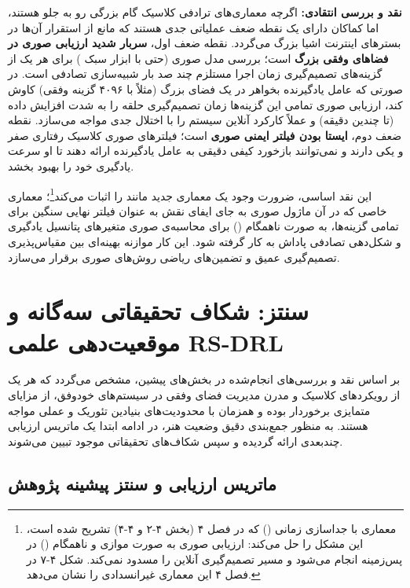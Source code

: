 \documentclass[oneside,openany,phd]{TMU-Thesis}
\begin{document}
\textbf{نقد و بررسی انتقادی:}
اگرچه معماری‌های ترادفی کلاسیک گام بزرگی رو به جلو هستند، اما کماکان دارای یک نقطه ضعف عملیاتی جدی هستند که مانع از استقرار آن‌ها در بسترهای اینترنت اشیا بزرگ می‌گردد.
نقطه ضعف اول، \textbf{سربار شدید ارزیابی صوری در فضاهای وفقی بزرگ} است؛ بررسی مدل صوری (حتی با ابزار سبک ) برای هر یک از گزینه‌های تصمیم‌گیری زمان اجرا مستلزم چند صد بار شبیه‌سازی تصادفی است. در صورتی که عامل یادگیرنده بخواهر در یک فضای بزرگ (مثلاً با ۴۰۹۶ گزینه وفقی) کاوش کند، ارزیابی صوری تمامی این گزینه‌ها زمان تصمیم‌گیری حلقه  را به شدت افزایش داده (تا چندین دقیقه) و عملاً کارکرد آنلاین سیستم را با اختلال جدی مواجه می‌سازد.
نقطه ضعف دوم، \textbf{ایستا بودن فیلتر ایمنی صوری} است؛ فیلترهای صوری کلاسیک رفتاری صفر و یکی دارند و نمی‌توانند بازخورد کیفی دقیقی به عامل یادگیرنده ارائه دهند تا او سرعت یادگیری خود را بهبود بخشد.

این نقد اساسی، ضرورت وجود یک معماری جدید مانند  را اثبات می‌کند\footnote{معماری  با جداسازی زمانی () که در فصل ۴ (بخش ۴-۲ و ۴-۴) تشریح شده است، این مشکل را حل می‌کند: ارزیابی صوری به صورت موازی و ناهمگام () در پس‌زمینه انجام می‌شود و مسیر تصمیم‌گیری آنلاین را مسدود نمی‌کند. شکل ۴-۷ در فصل ۴ این معماری غیرانسدادی را نشان می‌دهد.}؛ معماری خاصی که در آن ماژول صوری  به جای ایفای نقش به عنوان فیلتر نهایی سنگین برای تمامی گزینه‌ها، به صورت ناهمگام () برای محاسبه‌ی صوری متغیرهای پتانسیل یادگیری و شکل‌دهی تصادفی پاداش به کار گرفته شود. این کار موازنه بهینه‌ای بین مقیاس‌پذیری تصمیم‌گیری عمیق و تضمین‌های ریاضی روش‌های صوری برقرار می‌سازد.

\section{سنتز: شکاف تحقیقاتی سه‌گانه و موقعیت‌دهی علمی RS-DRL}
\label{sec:ch3_synthesis}

بر اساس نقد و بررسی‌های انجام‌شده در بخش‌های پیشین، مشخص می‌گردد که هر یک از رویکردهای کلاسیک و مدرن مدیریت فضای وفقی در سیستم‌های خودوفق، از مزایای متمایزی برخوردار بوده و همزمان با محدودیت‌های بنیادین تئوریک و عملی مواجه هستند. به منظور جمع‌بندی دقیق وضعیت هنر، در ادامه ابتدا یک ماتریس ارزیابی چندبعدی ارائه گردیده و سپس شکاف‌های تحقیقاتی موجود تبیین می‌شوند.

\subsection{ماتریس ارزیابی و سنتز پیشینه پژوهش}
\label{sec:ch3_synthesis_matrix}
\end{document}
